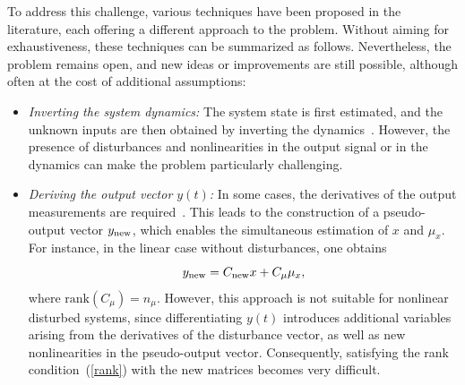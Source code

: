 \documentclass{ifacconf}
\def\eqref#1{(\ref{#1})}
\begin{document}
To address this challenge, various techniques have been proposed in the literature, each offering a different approach to the problem. Without aiming for exhaustiveness, these techniques can be summarized as follows. Nevertheless, the problem remains open, and new ideas or improvements are still possible, although often at the cost of additional assumptions:
\begin{itemize}
\item {\it Inverting the system dynamics:} The system state is first estimated, and the unknown inputs are then obtained by inverting the dynamics~\citep{Phanomchoeng:ASME/TM14,Benallouch:TCST17,Marquez:Auto14}. However, the presence of disturbances and nonlinearities in the output signal or in the dynamics can make the problem particularly challenging.
%



\item {\it Deriving the output vector $y(t)$:} In some cases, the derivatives of the output measurements are required~\citep{Hou:256351,Phanomchoeng:ASME/TM14}. This leads to the construction of a pseudo-output vector $y_{\rm new}$, which enables the simultaneous estimation of $x$ and $\mu_{x}$. For instance, in the linear case without disturbances, one obtains 
$$
y_{\rm new} = C_{\rm new} x + C_{\mu}\mu_{x},
$$
where $\mathrm{rank}(C_{\mu}) = n_{\mu}$. However, this approach is not suitable for nonlinear disturbed systems, since differentiating $y(t)$ introduces additional variables arising from the derivatives of the disturbance vector, as well as new nonlinearities in the pseudo-output vector. Consequently, satisfying the rank condition~\eqref{rank} with the new matrices becomes very difficult.


\end{itemize}
\end{document}
